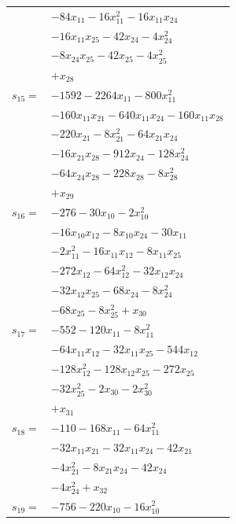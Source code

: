 \begin{longtable}{@{}r@{\;}l@{}}
 & \(\displaystyle -84x_{11} -16x_{11}^{2} -16x_{11}x_{24}\) \\
 & \(\displaystyle -16x_{11}x_{25} -42x_{24} -4x_{24}^{2}\) \\
 & \(\displaystyle -8x_{24}x_{25} -42x_{25} -4x_{25}^{2}\) \\
 & \(\displaystyle +x_{28}\) \\[3pt]
\(s_{15}=\) & \(\displaystyle -1592 -2264x_{11} -800x_{11}^{2}\) \\
 & \(\displaystyle -160x_{11}x_{21} -640x_{11}x_{24} -160x_{11}x_{28}\) \\
 & \(\displaystyle -220x_{21} -8x_{21}^{2} -64x_{21}x_{24}\) \\
 & \(\displaystyle -16x_{21}x_{28} -912x_{24} -128x_{24}^{2}\) \\
 & \(\displaystyle -64x_{24}x_{28} -228x_{28} -8x_{28}^{2}\) \\
 & \(\displaystyle +x_{29}\) \\[3pt]
\(s_{16}=\) & \(\displaystyle -276 -30x_{10} -2x_{10}^{2}\) \\
 & \(\displaystyle -16x_{10}x_{12} -8x_{10}x_{24} -30x_{11}\) \\
 & \(\displaystyle -2x_{11}^{2} -16x_{11}x_{12} -8x_{11}x_{25}\) \\
 & \(\displaystyle -272x_{12} -64x_{12}^{2} -32x_{12}x_{24}\) \\
 & \(\displaystyle -32x_{12}x_{25} -68x_{24} -8x_{24}^{2}\) \\
 & \(\displaystyle -68x_{25} -8x_{25}^{2} +x_{30}\) \\[3pt]
\(s_{17}=\) & \(\displaystyle -552 -120x_{11} -8x_{11}^{2}\) \\
 & \(\displaystyle -64x_{11}x_{12} -32x_{11}x_{25} -544x_{12}\) \\
 & \(\displaystyle -128x_{12}^{2} -128x_{12}x_{25} -272x_{25}\) \\
 & \(\displaystyle -32x_{25}^{2} -2x_{30} -2x_{30}^{2}\) \\
 & \(\displaystyle +x_{31}\) \\[3pt]
\(s_{18}=\) & \(\displaystyle -110 -168x_{11} -64x_{11}^{2}\) \\
 & \(\displaystyle -32x_{11}x_{21} -32x_{11}x_{24} -42x_{21}\) \\
 & \(\displaystyle -4x_{21}^{2} -8x_{21}x_{24} -42x_{24}\) \\
 & \(\displaystyle -4x_{24}^{2} +x_{32}\) \\[3pt]
\(s_{19}=\) & \(\displaystyle -756 -220x_{10} -16x_{10}^{2}\) \\

\end{longtable}
